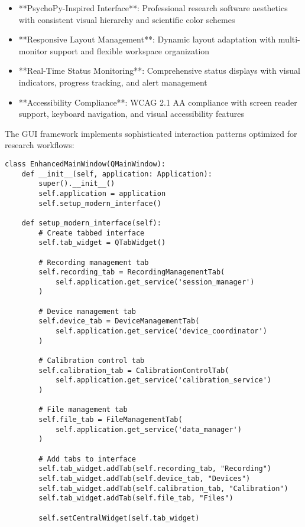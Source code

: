 \documentclass[12pt,a4paper]{report}
\begin{document}
\begin{itemize}
\item **PsychoPy-Inspired Interface**: Professional research software aesthetics with consistent visual hierarchy and
  scientific color schemes
\item **Responsive Layout Management**: Dynamic layout adaptation with multi-monitor support and flexible workspace
  organization
\item **Real-Time Status Monitoring**: Comprehensive status displays with visual indicators, progress tracking, and alert
  management
\item **Accessibility Compliance**: WCAG 2.1 AA compliance with screen reader support, keyboard navigation, and visual
  accessibility features

\end{itemize}
The GUI framework implements sophisticated interaction patterns optimized for research workflows:

\begin{verbatim}
class EnhancedMainWindow(QMainWindow):
    def __init__(self, application: Application):
        super().__init__()
        self.application = application
        self.setup_modern_interface()

    def setup_modern_interface(self):
        # Create tabbed interface
        self.tab_widget = QTabWidget()

        # Recording management tab
        self.recording_tab = RecordingManagementTab(
            self.application.get_service('session_manager')
        )

        # Device management tab
        self.device_tab = DeviceManagementTab(
            self.application.get_service('device_coordinator')
        )

        # Calibration control tab
        self.calibration_tab = CalibrationControlTab(
            self.application.get_service('calibration_service')
        )

        # File management tab
        self.file_tab = FileManagementTab(
            self.application.get_service('data_manager')
        )

        # Add tabs to interface
        self.tab_widget.addTab(self.recording_tab, "Recording")
        self.tab_widget.addTab(self.device_tab, "Devices")
        self.tab_widget.addTab(self.calibration_tab, "Calibration")
        self.tab_widget.addTab(self.file_tab, "Files")

        self.setCentralWidget(self.tab_widget)
\end{verbatim}
\end{document}
